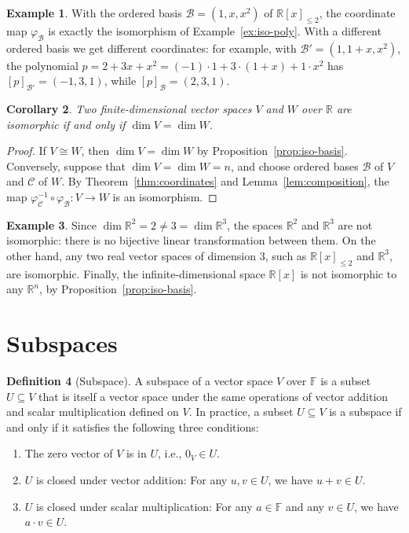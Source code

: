 \documentclass[11pt]{article}
\theoremstyle{definition}
\newtheorem{definition}{Definition}[section]
\newtheorem{example}[definition]{Example}
\theoremstyle{plain}
\newtheorem{corollary}[definition]{Corollary}
\theoremstyle{remark}
\begin{document}
\begin{example}
    With the ordered basis $\mathcal{B} = (1, x, x^2)$ of $\mathbb{R}[x]_{\leq 2}$, the coordinate map $\varphi_{\mathcal{B}}$ is exactly the isomorphism of Example~\ref{ex:iso-poly}. With a different ordered basis we get different coordinates: for example, with $\mathcal{B}' = (1, 1 + x, x^2)$, the polynomial $p = 2 + 3x + x^2 = (-1) \cdot 1 + 3 \cdot (1 + x) + 1 \cdot x^2$ has $[p]_{\mathcal{B}'} = (-1, 3, 1)$, while $[p]_{\mathcal{B}} = (2, 3, 1)$.
\end{example}

\begin{corollary}\label{cor:iso-dim}
    Two finite-dimensional vector spaces $V$ and $W$ over $\mathbb{R}$ are isomorphic if and only if $\dim V = \dim W$.
\end{corollary}

\begin{proof}
    If $V \cong W$, then $\dim V = \dim W$ by Proposition~\ref{prop:iso-basis}. Conversely, suppose that $\dim V = \dim W = n$, and choose ordered bases $\mathcal{B}$ of $V$ and $\mathcal{C}$ of $W$. By Theorem~\ref{thm:coordinates} and Lemma~\ref{lem:composition}, the map $\varphi_{\mathcal{C}}^{-1} \circ \varphi_{\mathcal{B}}: V \to W$ is an isomorphism.
\end{proof}

\begin{example}
    Since $\dim \mathbb{R}^2 = 2 \neq 3 = \dim \mathbb{R}^3$, the spaces $\mathbb{R}^2$ and $\mathbb{R}^3$ are not isomorphic: there is no bijective linear transformation between them. On the other hand, any two real vector spaces of dimension $3$, such as $\mathbb{R}[x]_{\leq 2}$ and $\mathbb{R}^3$, are isomorphic. Finally, the infinite-dimensional space $\mathbb{R}[x]$ is not isomorphic to any $\mathbb{R}^n$, by Proposition~\ref{prop:iso-basis}.
\end{example}

\section{Subspaces}\label{sec:subspaces}

\begin{definition}[Subspace]\label{def:subspace}
    A subspace of a vector space $V$ over $\mathbb{F}$ is a subset $U \subseteq V$ that is itself a vector space under the same operations of vector addition and scalar multiplication defined on $V$. In practice, a subset $U \subseteq V$ is a subspace if and only if it satisfies the following three conditions:
    \begin{enumerate}
        \item The zero vector of $V$ is in $U$, i.e., $0_V \in U$.
        \item $U$ is closed under vector addition: For any $u, v \in U$, we have $u + v \in U$.
        \item $U$ is closed under scalar multiplication: For any $a \in \mathbb{F}$ and any $v \in U$, we have $a \cdot v \in U$.
    \end{enumerate}
\end{definition}
\end{document}
